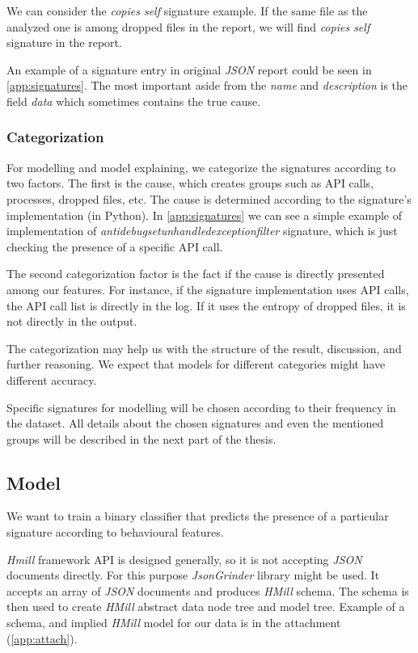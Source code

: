 We can consider the \emph{copies self} signature example. If the same file as the analyzed one is among dropped files in the report, we will find \emph{copies self} signature in the report.

An example of a signature entry in original \emph{JSON} report could be seen in \ref{app:signatures}. The most important aside from the \emph{name} and \emph{description} is the field \emph{data} which sometimes contains the true cause.

\subsubsection{Categorization}
For modelling and model explaining, we categorize the signatures according to two factors. The first is the cause, which creates groups such as API calls, processes, dropped files, etc. The cause is determined according to the signature's implementation (in Python). In \ref{app:signatures} we can see a simple example of implementation of \emph{antidebugsetunhandledexceptionfilter} signature, which is just checking the presence of a specific API call.

The second categorization factor is the fact if the cause is directly presented among our features. For instance, if the signature implementation uses API calls, the API call list is directly in the log. If it uses the entropy of dropped files, it is not directly in the output.

The categorization may help us with the structure of the result, discussion, and further reasoning. We expect that models for different categories might have different accuracy.

Specific signatures for modelling will be chosen according to their frequency in the dataset. All details about the chosen signatures and even the mentioned groups will be described in the next part of the thesis.

\subsection{Model}
We want to train a binary classifier that predicts the presence of a particular signature according to behavioural features.

\emph{Hmill} framework API is designed generally, so it is not accepting \emph{JSON} documents directly. For this purpose \emph{JsonGrinder} library might be used. It accepts an array of \emph{JSON} documents and produces \emph{HMill} schema. The schema is then used to create \emph{HMill} abstract data node tree and model tree. Example of a schema, and implied \emph{HMill} model for our data is in the attachment (\ref{app:attach}).